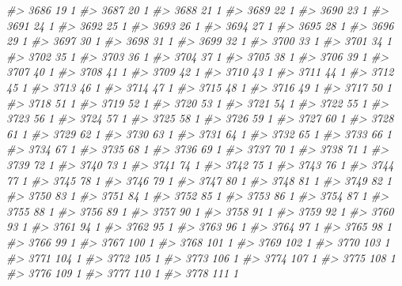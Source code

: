 \documentclass[]{article}
\newenvironment{Shaded}{\begin{snugshade}}{\end{snugshade}}
\newcommand{\CommentTok}[1]{\textcolor[rgb]{0.56,0.35,0.01}{\textit{#1}}}
\begin{document}
\begin{Shaded}
\begin{Highlighting}[]
\CommentTok{#> 3686  19  1}
\CommentTok{#> 3687  20  1}
\CommentTok{#> 3688  21  1}
\CommentTok{#> 3689  22  1}
\CommentTok{#> 3690  23  1}
\CommentTok{#> 3691  24  1}
\CommentTok{#> 3692  25  1}
\CommentTok{#> 3693  26  1}
\CommentTok{#> 3694  27  1}
\CommentTok{#> 3695  28  1}
\CommentTok{#> 3696  29  1}
\CommentTok{#> 3697  30  1}
\CommentTok{#> 3698  31  1}
\CommentTok{#> 3699  32  1}
\CommentTok{#> 3700  33  1}
\CommentTok{#> 3701  34  1}
\CommentTok{#> 3702  35  1}
\CommentTok{#> 3703  36  1}
\CommentTok{#> 3704  37  1}
\CommentTok{#> 3705  38  1}
\CommentTok{#> 3706  39  1}
\CommentTok{#> 3707  40  1}
\CommentTok{#> 3708  41  1}
\CommentTok{#> 3709  42  1}
\CommentTok{#> 3710  43  1}
\CommentTok{#> 3711  44  1}
\CommentTok{#> 3712  45  1}
\CommentTok{#> 3713  46  1}
\CommentTok{#> 3714  47  1}
\CommentTok{#> 3715  48  1}
\CommentTok{#> 3716  49  1}
\CommentTok{#> 3717  50  1}
\CommentTok{#> 3718  51  1}
\CommentTok{#> 3719  52  1}
\CommentTok{#> 3720  53  1}
\CommentTok{#> 3721  54  1}
\CommentTok{#> 3722  55  1}
\CommentTok{#> 3723  56  1}
\CommentTok{#> 3724  57  1}
\CommentTok{#> 3725  58  1}
\CommentTok{#> 3726  59  1}
\CommentTok{#> 3727  60  1}
\CommentTok{#> 3728  61  1}
\CommentTok{#> 3729  62  1}
\CommentTok{#> 3730  63  1}
\CommentTok{#> 3731  64  1}
\CommentTok{#> 3732  65  1}
\CommentTok{#> 3733  66  1}
\CommentTok{#> 3734  67  1}
\CommentTok{#> 3735  68  1}
\CommentTok{#> 3736  69  1}
\CommentTok{#> 3737  70  1}
\CommentTok{#> 3738  71  1}
\CommentTok{#> 3739  72  1}
\CommentTok{#> 3740  73  1}
\CommentTok{#> 3741  74  1}
\CommentTok{#> 3742  75  1}
\CommentTok{#> 3743  76  1}
\CommentTok{#> 3744  77  1}
\CommentTok{#> 3745  78  1}
\CommentTok{#> 3746  79  1}
\CommentTok{#> 3747  80  1}
\CommentTok{#> 3748  81  1}
\CommentTok{#> 3749  82  1}
\CommentTok{#> 3750  83  1}
\CommentTok{#> 3751  84  1}
\CommentTok{#> 3752  85  1}
\CommentTok{#> 3753  86  1}
\CommentTok{#> 3754  87  1}
\CommentTok{#> 3755  88  1}
\CommentTok{#> 3756  89  1}
\CommentTok{#> 3757  90  1}
\CommentTok{#> 3758  91  1}
\CommentTok{#> 3759  92  1}
\CommentTok{#> 3760  93  1}
\CommentTok{#> 3761  94  1}
\CommentTok{#> 3762  95  1}
\CommentTok{#> 3763  96  1}
\CommentTok{#> 3764  97  1}
\CommentTok{#> 3765  98  1}
\CommentTok{#> 3766  99  1}
\CommentTok{#> 3767 100  1}
\CommentTok{#> 3768 101  1}
\CommentTok{#> 3769 102  1}
\CommentTok{#> 3770 103  1}
\CommentTok{#> 3771 104  1}
\CommentTok{#> 3772 105  1}
\CommentTok{#> 3773 106  1}
\CommentTok{#> 3774 107  1}
\CommentTok{#> 3775 108  1}
\CommentTok{#> 3776 109  1}
\CommentTok{#> 3777 110  1}
\CommentTok{#> 3778 111  1}

\end{Highlighting}
\end{Shaded}
\end{document}

